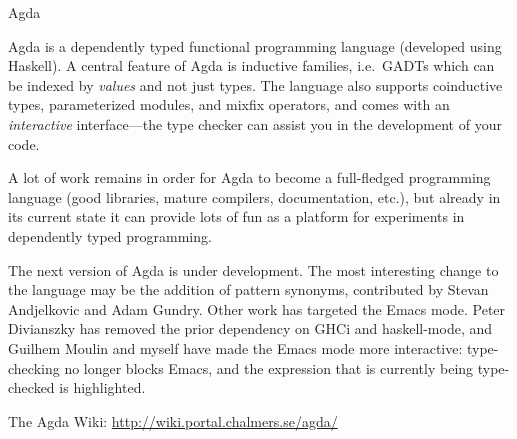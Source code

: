 \documentclass{article}
\begin{document}
\begin{hcarentry}{Agda}
\label{agda}
\makeheader

Agda is a dependently typed functional programming language (developed
using Haskell). A central feature of Agda is inductive families, i.e.\
GADTs which can be indexed by \emph{values} and not just types. The
language also supports coinductive types, parameterized modules, and
mixfix operators, and comes with an \emph{interactive} interface---the
type checker can assist you in the development of your code.

A lot of work remains in order for Agda to become a full-fledged
programming language (good libraries, mature compilers, documentation,
etc.), but already in its current state it can provide lots of fun as
a platform for experiments in dependently typed programming.

The next version of Agda is under development. The most interesting
change to the language may be the addition of pattern synonyms,
contributed by Stevan Andjelkovic and Adam Gundry. Other work has
targeted the Emacs mode. Peter Divianszky has removed the prior
dependency on GHCi and haskell-mode, and Guilhem Moulin and myself
have made the Emacs mode more interactive: type-checking no longer
blocks Emacs, and the expression that is currently being type-checked
is highlighted.

\FurtherReading
  The Agda Wiki: \url{http://wiki.portal.chalmers.se/agda/}
\end{hcarentry}
\end{document}
